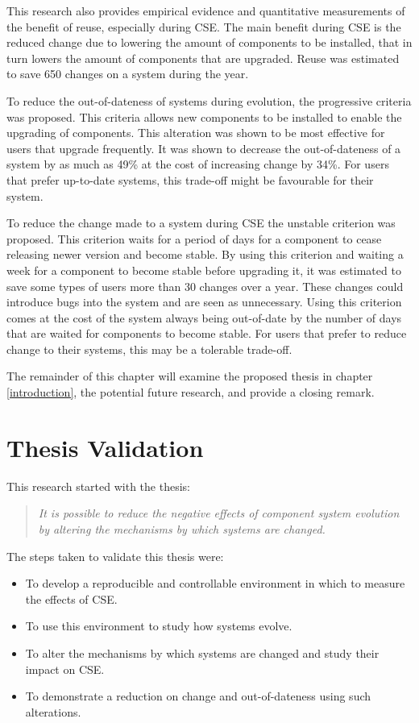 This research also provides empirical evidence and quantitative measurements of the benefit of reuse, especially during CSE.
The main benefit during CSE is the reduced change due to lowering the amount of components to be installed,
that in turn lowers the amount of components that are upgraded.
Reuse was estimated to save 650 changes on a system during the year. 

To reduce the out-of-dateness of systems during evolution, the progressive criteria was proposed.
This criteria allows new components to be installed to enable the upgrading of components.
This alteration was shown to be most effective for users that upgrade frequently.
It was shown to decrease the out-of-dateness of a system by as much as 49\% at the cost of increasing change by 34\%.
For users that prefer up-to-date systems, this trade-off might be favourable for their system.

To reduce the change made to a system during CSE the unstable criterion was proposed.
This criterion waits for a period of days for a component to cease releasing newer version and become stable.
By using this criterion and waiting a week for a component to become stable before upgrading it, it was estimated to save some types of users more than 30 changes over a year.
These changes could introduce bugs into the system and are seen as unnecessary. 
Using this criterion comes at the cost of the system always being out-of-date by the number of days that are waited for components to become stable.
For users that prefer to reduce change to their systems, this may be a tolerable trade-off.

The remainder of this chapter will examine the proposed thesis in chapter \ref{introduction},
the potential future research,
and provide a closing remark.
\section{Thesis Validation}
This research started with the thesis:
\begin{quote}
\textit{It is possible to reduce the negative effects of component system evolution by altering the mechanisms by which systems are changed.} 
\end{quote}

The steps taken to validate this thesis were:
\begin{itemize}
  \item To develop a reproducible and controllable environment in which to measure the effects of CSE.
  \item To use this environment to study how systems evolve.
  \item To alter the mechanisms by which systems are changed and study their impact on CSE.
  \item To demonstrate a reduction on change and out-of-dateness using such alterations.
\end{itemize}

